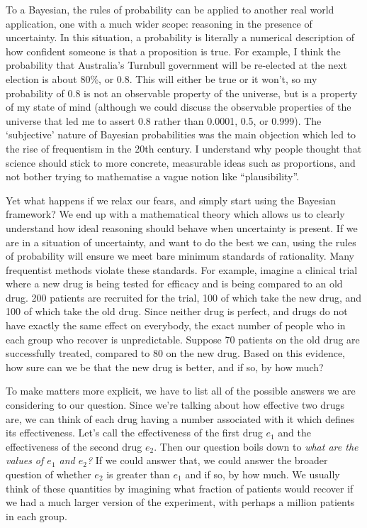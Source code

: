 \documentclass[a4paper, 12pt]{article}
\begin{document}
To a Bayesian, the rules of probability can be applied to another real world
application, one with a much wider scope: reasoning in the presence of
uncertainty. In this situation, a probability is literally a numerical
description of how confident someone is that a proposition is true. For example,
I think the probability that Australia's Turnbull government will be
re-elected at the next election is about 80\%, or 0.8. This will either be true
or it won't, so my probability of 0.8 is not an observable property of
the universe, but is a property of my state of mind (although we could
discuss the observable properties of the universe that led me to assert 0.8
rather than 0.0001, 0.5, or 0.999). The `subjective' nature of Bayesian
probabilities was the main objection which led to the rise of frequentism in
the 20th century. I understand why people thought that science should stick
to more concrete, measurable ideas such as proportions, and not bother trying
to mathematise a vague notion like ``plausibility''.

Yet what happens if we relax our fears, and simply start using the Bayesian
framework? We end up with a mathematical theory which allows us to clearly
understand how ideal reasoning should behave when uncertainty is present. If we
are in a situation of uncertainty, and want to do the best we can, using the
rules of probability will ensure we meet bare minimum standards of rationality.
Many frequentist methods violate these standards.
For example, imagine a clinical trial where a new drug is being tested for
efficacy and is being compared to an old drug.
200 patients are recruited for the trial, 100
of which take the new drug, and 100 of which take the old drug. Since neither
drug is perfect, and drugs do not have exactly the same effect on everybody,
the exact number of people who in each group who recover is unpredictable.
Suppose 70 patients on the old drug are successfully treated, compared to
80 on the new drug. Based on this evidence, how sure can we be that the new
drug is better, and if so, by how much?

To make matters more explicit, we have to list all of the possible answers
we are considering to our question. Since we're talking about how effective
two drugs are, we can think of each drug having a number associated with it
which defines its effectiveness. Let's call the effectiveness of the first drug
$e_1$ and the effectiveness of the second drug $e_2$. Then our question boils
down to {\em what are the values of $e_1$ and $e_2$?} If we could answer that,
we could answer the broader question of whether $e_2$ is greater than $e_1$ and
if so, by how much. We usually think of these quantities by imagining what
fraction of patients would recover if we had a much larger version of the
experiment, with perhaps a million patients in each group.
\end{document}
